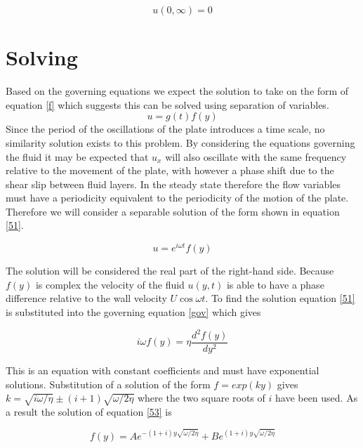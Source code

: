 \documentclass[paper=a4, fontsize=12pt, abstract=on]{scrartcl}
\numberwithin{equation}{section}		%
\numberwithin{figure}{section}			%
\numberwithin{table}{section}				%
\begin{document}
 
  \begin{equation}
\label{b2}
u(0,\infty) = 0
\end{equation}

\section{Solving}
Based on the governing equations we expect the solution to take on the form of equation \ref{f} which suggests this can be solved using separation of variables.
\begin{equation}
\label{51}
u = g(t)f(y)
\end{equation}
Since the period of the oscillations of the plate introduces a time scale, no similarity solution exists to this problem. By considering the equations governing the fluid it may be expected that $u_x$ will also oscillate with the same frequency relative to the movement of the plate, with however a phase shift due to the shear slip between fluid layers. In the steady state therefore the flow variables must have a periodicity equivalent to the periodicity of the motion of the plate. Therefore we will consider a separable solution of the form shown in equation \ref{51}.

 \begin{equation}
\label{51}
u = e^{i\omega t}f(y)
\end{equation}


The solution will be considered the real part of the right-hand side. Because $f(y)$ is complex the velocity of the fluid $u(y,t)$ is able to have a phase difference relative to the wall velocity $U\cos \omega t$. To find the solution equation \ref{51} is substituted into the governing equation \ref{gov} which gives

\begin{equation}
\label{52}
i\omega f(y) = \eta \frac{d^2f(y)}{dy^2}
\end{equation}

This is an equation with constant coefficients and must have exponential solutions. Substitution of a solution of the form $f = exp(ky)$ gives $k = \sqrt{i\omega / \eta} \pm(i+1) \sqrt{\omega /2 \eta}$ where the two square roots of $i$ have been used. As a result the solution of equation \ref{53} is


\begin{equation}
\label{53}
f(y) = Ae^{-(1+i)y\sqrt{\omega/2\eta}}+Be^{(1+i)y\sqrt{\omega/2\eta}}
\end{equation}
\end{document}
